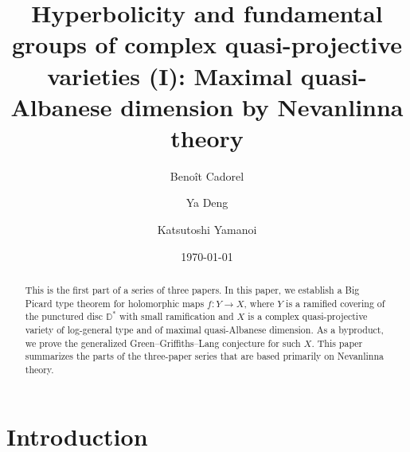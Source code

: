 \documentclass[11pt,english]{smfart}
\title[On the GGL conjecture]{Hyperbolicity and fundamental groups of complex quasi-projective varieties (I): Maximal quasi-Albanese dimension by Nevanlinna theory}
\date{\today}
\author[B. Cadorel]{Beno\^{i}t Cadorel}
\author[Y. Deng]{Ya Deng}
\author[K. Yamanoi]{Katsutoshi Yamanoi}
\theoremstyle{plain}
\theoremstyle{definition}
\theoremstyle{remark}
\numberwithin{equation}{section}
\theoremstyle{plain}
\newcommand{\bC}{\mathbb{C}}
\newcommand{\bD}{\mathbb{D}}
\begin{document}
 
	
	\begin{abstract}
	This is the first part of a series of three papers.
  In this paper, we establish a Big Picard type theorem for holomorphic maps $f:Y \to X$, where $Y$ is a ramified covering of the punctured disc $\bD^*$ with small ramification and $X$ is a complex quasi-projective variety of log-general type and of maximal quasi-Albanese dimension.
As a byproduct, we prove the generalized Green–Griffiths–Lang conjecture for such $X$. 
This paper summarizes the parts of the three-paper series that are based primarily on Nevanlinna theory.
	\end{abstract}
	
	\maketitle

\tableofcontents
\section{Introduction}
\end{document}
